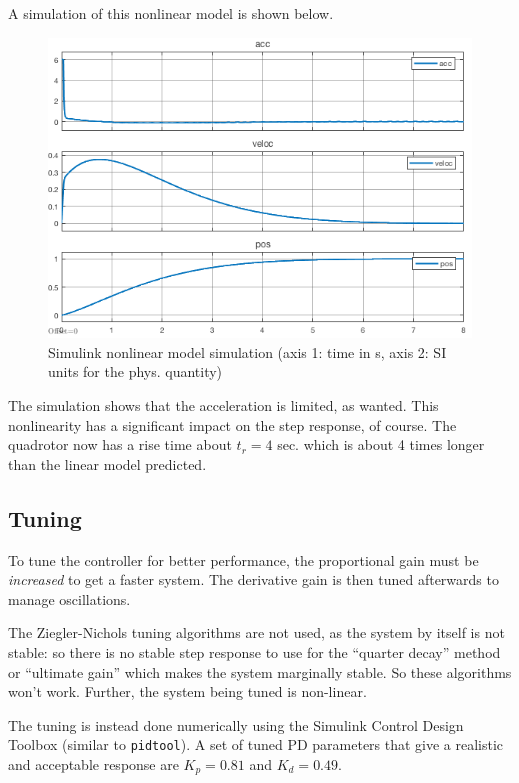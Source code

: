 \documentclass[a4paper]{report}
\begin{document}
A simulation of this nonlinear model is shown below.

\begin{figure}[H]
\centering
\includegraphics[width=12cm]{img/simulink_1d_sim2.png}
\caption{Simulink nonlinear model simulation (axis 1: time in \si{\second}, axis 2: SI units for the phys. quantity)\label{fig:simulink_1d_sim2}}
\end{figure}

The simulation shows that the acceleration is limited, as wanted.
This nonlinearity has a significant impact on the step response, of course. 
The quadrotor now has a rise time about $t_r = 4$ sec. which is about 4 times longer than the linear model predicted.

\subsection{Tuning}
To tune the controller for better performance, the proportional gain must be \textit{increased} to get a faster system. The derivative gain is then tuned afterwards to manage oscillations.

The Ziegler-Nichols tuning algorithms \cite[p. 206]{franklin} are not used, as the system by itself is not stable: so there is no stable step response to use for the ``quarter decay'' method or ``ultimate gain'' which makes the system marginally stable. So these algorithms won't work. Further, the system being tuned is non-linear.

The tuning is instead done numerically using the Simulink Control Design Toolbox (similar to \texttt{pidtool}). 
A set of tuned PD parameters that give a realistic and acceptable response are $K_p = 0.81$ and $K_d = 0.49$.
\end{document}
